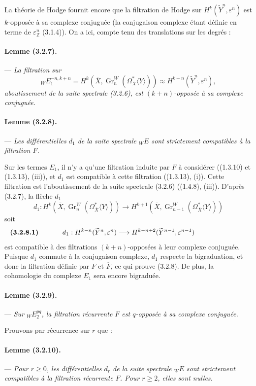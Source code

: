 \documentclass[10pt]{article}
\newcommand{\Z}{\mathbb Z}
\newcommand{\Gr}{\operatorname{Gr}}
\begin{document}
La théorie de Hodge fournit encore que la filtration de Hodge sur $H^k(\widetilde Y^n,\varepsilon^n)$ est $k$-opposée à sa complexe conjuguée (la conjugaison complexe étant définie en terme de $\varepsilon^n_\Z$ (3.1.4)). On a ici, compte tenu des translations sur les degrés :

\paragraph{Lemme (3.2.7).} --- {\itshape La filtration sur
\[
{}_W E_1^{-n,k+n}
=H^k(\overline X,\Gr_n^W(\Omega_{\overline X}^{*}\langle Y\rangle))
\approx H^{k-n}(\widetilde Y^n,\varepsilon^n),
\]
aboutissement de la suite spectrale (3.2.6), est $(k+n)$-opposée à sa complexe conjuguée.}

\paragraph{Lemme (3.2.8).} --- {\itshape Les différentielles $d_1$ de la suite spectrale ${}_WE$ sont strictement compatibles à la filtration $F$.}

Sur les termes $E_1$, il n'y a qu'une filtration induite par $F$ à considérer ((1.3.10) et (1.3.13), (iii)), et $d_1$ est compatible à cette filtration ((1.3.13), (i)). Cette filtration est l'aboutissement de la suite spectrale (3.2.6) ((1.4.8), (iii)). D'après (3.2.7), la flèche $d_1$
\[
d_1:H^k(\overline X,\Gr_n^W(\Omega_{\overline X}^{*}\langle Y\rangle))
\longrightarrow
H^{k+1}(\overline X,\Gr_{n-1}^W(\Omega_{\overline X}^{*}\langle Y\rangle))
\]
soit
\[
\makebox[\textwidth][s]{\textbf{(3.2.8.1)}\hfill$\displaystyle d_1:H^{k-n}(\widetilde Y^n,\varepsilon^n)\longrightarrow H^{k-n+2}(\widetilde Y^{n-1},\varepsilon^{n-1})$\hfill\phantom{\textbf{(3.2.8.1)}}}
\]
est compatible à des filtrations $(k+n)$-opposées à leur complexe conjuguée. Puisque $d_1$ commute à la conjugaison complexe, $d_1$ respecte la bigraduation, et donc la filtration définie par $F$ et $\overline F$, ce qui prouve (3.2.8). De plus, la cohomologie du complexe $E_1$ sera encore bigraduée.

\paragraph{Lemme (3.2.9).} --- {\itshape Sur ${}_WE_2^{pq}$, la filtration récurrente $F$ est $q$-opposée à sa complexe conjuguée.}

Prouvons par récurrence sur $r$ que :

\paragraph{Lemme (3.2.10).} --- {\itshape Pour $r\ge0$, les différentielles $d_r$ de la suite spectrale ${}_WE$ sont strictement compatibles à la filtration récurrente $F$. Pour $r\ge2$, elles sont nulles.}
\end{document}
